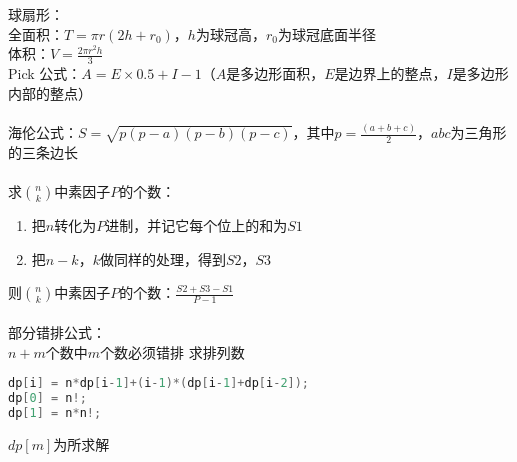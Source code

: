 球扇形：\\
全面积：$T = \pi r(2h+r_0)$，$h$为球冠高，$r_0$为球冠底面半径\\
体积：$V = \frac{2\pi r^{2}h}{3}$\\
Pick 公式：$A = E\times 0.5+I-1$（$A$是多边形面积，$E$是边界上的整点，$I$是多边形内部的整点）\\
\\
海伦公式：$S = \sqrt{p(p-a)(p-b)(p-c)}$，其中$p = \frac{(a+b+c)}{2}$，$abc$为三角形的三条边长\\
\\
求$\binom{n}{k}$中素因子$P$的个数：\\
\begin {enumerate}
\item 把$n$转化为$P$进制，并记它每个位上的和为$S1$
\item 把$n-k$，$k$做同样的处理，得到$S2$，$S3$
\end{enumerate}
则$\binom{n}{k}$中素因子$P$的个数：$\frac{S2+S3-S1}{P-1}$\\
\\
部分错排公式：\\
$n+m$个数中$m$个数必须错排 求排列数
\begin{lstlisting}[language=c++]
dp[i] = n*dp[i-1]+(i-1)*(dp[i-1]+dp[i-2]);
dp[0] = n!;
dp[1] = n*n!;
\end{lstlisting}
$dp[m]$为所求解\\
